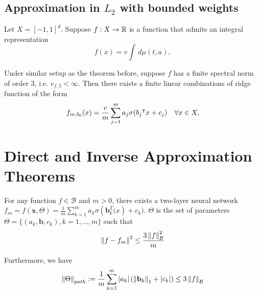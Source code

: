 \subsection{Approximation in $L_2$ with bounded weights}

\begin{theorem}
    Let $X=[-1,1]^d$. Suppose $f: X \to \mathbb{R}$ is a function that admits an
    integral representation
    \begin{equation}
        f(x) = v \int \,d\mu(t,a),
    \end{equation}

\end{theorem}


\begin{theorem}
    Under similar setup as the theorem before, suppose $f$ has a finite spectral
    norm of order $3$, i.e. $v_{f,3} < \infty$. Then there exists a finite
    linear combinations of ridge function of the form
    \begin{equation}
        f_{m, b_0}(x) = \frac{v}{m}\sum_{j=1}^m a_j \sigma_{\text{}}(b_j{}^{\intercal} x + c_j)
        \quad \forall x \in X,
    \end{equation}

\end{theorem}


\newpage

\section{Direct and Inverse Approximation Theorems}

\begin{theorem} 
    For any function $f \in \mathcal{B}$ and $m > 0$, there exists a two-layer
    neural network $f_m = f(\mathbf{x}, \Theta) = \frac{1}{m}\sum_{k=1}^m a_k
        \sigma(\mathbf{b}_k^T \mathbf(x) + c_k)$. $\Theta$ is the set of parameters
    $\Theta = \{(a_k, \mathbf{b}, c_k), k=1,\dots,m\}$ such that
    \begin{equation*}
        \left\| f - f_m \right\|^2 \leq \frac{3\left\| f \right\|_{\mathcal{B}}^2}{m}
    \end{equation*}

    Furthermore, we have
    \begin{equation}
        \left\| \Theta \right\|_{path} := \frac{1}{m} \sum_{k=1}^m \left| a_k \right| (\left\| \mathbf{b}_k \right\|_1 + \left| c_k \right|)
        \leq 3\left\| f \right\|_{\mathcal{B}}
    \end{equation}
\end{theorem}


